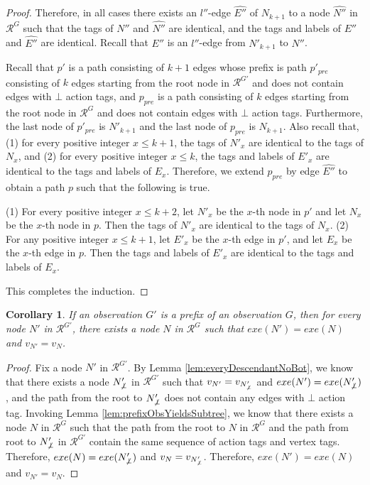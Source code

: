 \documentclass[11pt]{article}
\numberwithin{theorem}{section}
\newtheorem{corollary}[theorem]{Corollary}
\begin{document}
\begin{proof}
Therefore, in all cases there exists an $l''$-edge $\widehat{E''}$ of $N_{k+1}$ to a node $\widehat{N''}$ in $\mathcal{R}^G$ such that  the tags  of $N''$ and $\widehat{N''}$ are identical, and the tags and labels of $E''$ and $\widehat{E''}$ are identical. Recall that $E''$ is an $l''$-edge from $N'_{k+1}$ to $N''$.


Recall that $p'$ is a path consisting of $k+1$ edges whose prefix is path $p'_{pre}$ consisting of $k$ edges starting from the root node in $\mathcal{R}^{G'}$  and does not contain edges with $\bot$ action tags, and $p_{pre}$ is a path consisting of $k$ edges starting from the root node in $\mathcal{R}^{G}$  and does not contain edges with $\bot$ action tags. Furthermore, the last node of $p'_{pre}$ is $N'_{k+1}$ and the last node of $p_{pre}$ is $N_{k+1}$. Also recall that, (1) for every positive integer $x \leq k+1$, the tags of $N'_x$ are identical to the tags of $N_x$, and (2) for every positive integer $x \leq k$, the tags and labels of $E'_x$ are identical to the tags and labels of $E_x$. Therefore, we extend $p_{pre}$ by edge $\widehat{E''}$ to obtain a path $p$ such that the following is true.

(1) For every positive integer $x \leq k+2$, let $N'_x$ be the $x$-th node in $p'$ and let $N_x$ be the $x$-th node in $p$. Then the tags of $N'_x$ are identical to the tags of $N_x$. (2) For any positive integer $x \leq k+1$, let $E'_x$ be the $x$-th edge in $p'$, and let $E_x$ be the $x$-th edge in $p$. Then the tags and labels of $E'_x$ are identical to the tags and labels of $E_x$.

This completes the induction.
\end{proof}


\begin{corollary}\label{cor:prefixObsPrefixExe}
If an observation $G'$ is a prefix of an observation $G$, then for every node $N'$ in $\mathcal{R}^{G'}$, there exists a node $N$ in $\mathcal{R}^G$ such that $exe(N') = exe(N)$ and $v_{N'} = v_N$.
\end{corollary}
\begin{proof}
Fix a node $N'$ in $\mathcal{R}^{G'}$. By Lemma \ref{lem:everyDescendantNoBot}, we know that there exists a node $N'_{\not\bot}$ in $\mathcal{R}^{G'}$ such that $v_{N'} = v_{N'_{\not\bot}}$ and $exe(N') = exe(N'_{\not\bot})$, and the path from the root to $N'_{\not\bot}$ does not contain any edges with $\bot$ action tag. Invoking Lemma \ref{lem:prefixObsYieldsSubtree}, we know that there exists a node $N$ in $\mathcal{R}^G$ such that the path from the root to $N$ in $\mathcal{R}^G$ and the path from root to $N'_{\not\bot}$ in $\mathcal{R}^{G'}$ contain the same sequence of action tags and vertex tags. Therefore, $exe(N) = exe(N'_{\not\bot})$ and $v_N = v_{N'_{\not\bot}}$. Therefore, $exe(N') = exe(N)$ and $v_{N'} = v_N$.
\end{proof}
\end{document}
